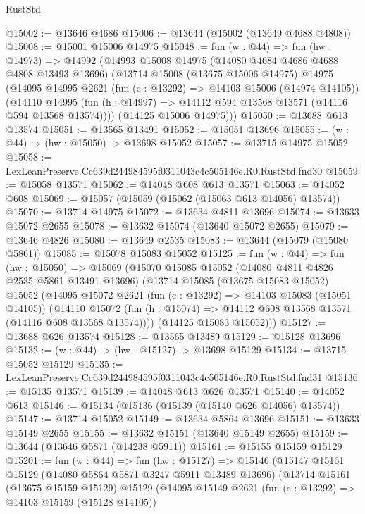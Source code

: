 \begin{lexlean}{RustStd}
\begin{coremodule}
@15002 := @13646 @4686
@15006 := @13644 (@15002 (@13649 @4688 @4808))
@15008 := @15001 @15006 @14975
@15048 := fun (w : @44) =>
  fun (hw : @14973) =>
  @14992
    (@14993
      @15008
      @14975
      (@14080 @4684 @4686 @4688 @4808 @13493 @13696)
      (@13714
        @15008
        (@13675 @15006 @14975)
        @14975
        (@14095
          @14995
          @2621
          (fun (c : @13292) => @14103 @15006 (@14974 @14105))
          (@14110
            @14995
            (fun (h : @14997) => @14112 @594 @13568 @13571 (@14116 @594 @13568 @13574))))
        (@14125 @15006 @14975)))
@15050 := @13688 @613 @13574
@15051 := @13565 @13491
@15052 := @15051 @13696
@15055 := (w : @44) -> (hw : @15050) -> @13698 @15052
@15057 := @13715 @14975 @15052
@15058 := LexLeanPreserve.Cc639d244984595f0311043c4c505146e.R0.RustStd.fnd30
@15059 := @15058 @13571
@15062 := @14048 @608 @613 @13571
@15063 := @14052 @608
@15069 := @15057 (@15059 (@15062 (@15063 @613 @14056) @13574))
@15070 := @13714 @14975
@15072 := @13634 @4811 @13696
@15074 := @13633 @15072 @2655
@15078 := @13632 @15074 (@13640 @15072 @2655)
@15079 := @13646 @4826
@15080 := @13649 @2535
@15083 := @13644 (@15079 (@15080 @5861))
@15085 := @15078 @15083 @15052
@15125 := fun (w : @44) =>
  fun (hw : @15050) =>
  @15069
    (@15070
      @15085
      @15052
      (@14080 @4811 @4826 @2535 @5861 @13491 @13696)
      (@13714
        @15085
        (@13675 @15083 @15052)
        @15052
        (@14095
          @15072
          @2621
          (fun (c : @13292) => @14103 @15083 (@15051 @14105))
          (@14110
            @15072
            (fun (h : @15074) => @14112 @608 @13568 @13571 (@14116 @608 @13568 @13574))))
        (@14125 @15083 @15052)))
@15127 := @13688 @626 @13574
@15128 := @13565 @13489
@15129 := @15128 @13696
@15132 := (w : @44) -> (hw : @15127) -> @13698 @15129
@15134 := @13715 @15052 @15129
@15135 := LexLeanPreserve.Cc639d244984595f0311043c4c505146e.R0.RustStd.fnd31
@15136 := @15135 @13571
@15139 := @14048 @613 @626 @13571
@15140 := @14052 @613
@15146 := @15134 (@15136 (@15139 (@15140 @626 @14056) @13574))
@15147 := @13714 @15052
@15149 := @13634 @5864 @13696
@15151 := @13633 @15149 @2655
@15155 := @13632 @15151 (@13640 @15149 @2655)
@15159 := @13644 (@13646 @5871 (@14238 @5911))
@15161 := @15155 @15159 @15129
@15201 := fun (w : @44) =>
  fun (hw : @15127) =>
  @15146
    (@15147
      @15161
      @15129
      (@14080 @5864 @5871 @3247 @5911 @13489 @13696)
      (@13714
        @15161
        (@13675 @15159 @15129)
        @15129
        (@14095
          @15149
          @2621
          (fun (c : @13292) => @14103 @15159 (@15128 @14105))

\end{coremodule}
\end{lexlean}
